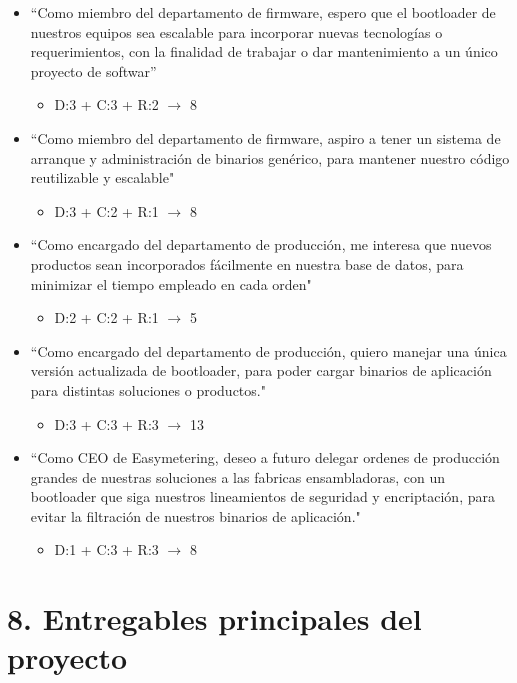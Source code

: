 \documentclass[
11pt, %
]{charter}
\begin{document}
\begin{itemize}
	\item ``Como miembro del departamento de firmware, espero que el bootloader de nuestros equipos sea escalable para incorporar nuevas tecnologías o requerimientos, con la finalidad de trabajar o dar mantenimiento a un único proyecto de softwar''
	\begin{itemize}
		\item D:3 + C:3 + R:2 $\rightarrow$ 8
	\end{itemize}
	\item ``Como miembro del departamento de firmware, aspiro a tener un sistema de arranque y administración de binarios genérico, para mantener nuestro código reutilizable y escalable"
	\begin{itemize}
		\item D:3 + C:2 + R:1 $\rightarrow$ 8
	\end{itemize}
	\item ``Como encargado del departamento de producción, me interesa que nuevos productos sean incorporados fácilmente en nuestra base de datos, para minimizar el tiempo empleado en cada orden"
	\begin{itemize}
		\item D:2 + C:2 + R:1 $\rightarrow$ 5
	\end{itemize}
	\item ``Como encargado del departamento de producción, quiero manejar una única versión actualizada de bootloader, para poder cargar binarios de aplicación para distintas soluciones o productos."
	\begin{itemize}
		\item D:3 + C:3 + R:3 $\rightarrow$ 13
	\end{itemize}
	\item ``Como CEO de Easymetering, deseo a futuro delegar ordenes de producción grandes de nuestras soluciones a las fabricas ensambladoras, con un bootloader que siga nuestros lineamientos de seguridad y encriptación, para evitar la filtración de nuestros binarios de aplicación."
	\begin{itemize}
		\item D:1 + C:3 + R:3 $\rightarrow$ 8
	\end{itemize}
\end{itemize}

\section{8. Entregables principales del proyecto}
\label{sec:entregables}
\end{document}

